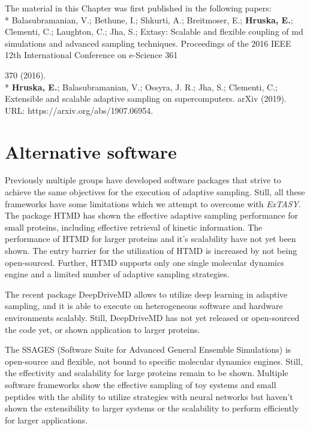 The material in this Chapter was first published in the following papers: 
\\*
\cite{Extasy2016} Balasubramanian, V.; Bethune, I.; Shkurti, A.; Breitmoser, E.; \textbf{Hruska, E.}; Clementi, C.; Laughton, C.; Jha, S.; Extasy: Scalable and flexible coupling of md simulations
and advanced sampling techniques. Proceedings of the 2016 IEEE 12th
International Conference on e-Science 361{370 (2016).
\\*
\cite{Extasy2019} \textbf{Hruska, E.}; Balasubramanian, V.; Ossyra, J. R.; Jha, S.; Clementi, C.; Extensible
and scalable adaptive sampling on supercomputers. arXiv (2019). URL: https://arxiv.org/abs/1907.06954.


\section{\label{sec:alternative4}Alternative software}

Previously multiple groups have developed software packages that strive to achieve the same objectives for the execution of adaptive sampling. Still, all these frameworks have some limitations which we attempt to overcome with \emph{ExTASY}.
The package HTMD\cite{doerr2016htmd} has shown the effective adaptive sampling performance for small proteins, including effective retrieval of kinetic information. The performance of HTMD for larger proteins and it's scalability have not yet been shown. The entry barrier for the utilization of HTMD is increased by not being open-sourced. Further, HTMD supports only one single molecular dynamics engine and a limited number of adaptive sampling strategies.

The recent package DeepDriveMD \cite{leeDeepDriveMDDeepLearningDriven2019} allows to utilize deep learning in adaptive sampling, and it is able to execute on heterogeneous software and hardware environments scalably. Still, DeepDriveMD has not yet released or open-sourced the code yet, or shown application to larger proteins. 

The SSAGES (Software Suite for Advanced General Ensemble Simulations) \cite{SSAGES} is open-source and flexible, not bound to specific molecular dynamics engines. Still, the effectivity and scalability for large proteins remain to be shown. Multiple software frameworks \cite{jung2019acp, ribeiro2018tjocp, bonati2019pnasu} show the effective sampling of toy systems and small peptides with the ability to utilize strategies with neural networks but haven't shown the extensibility to larger systems or the scalability to perform efficiently for larger applications. 



}
